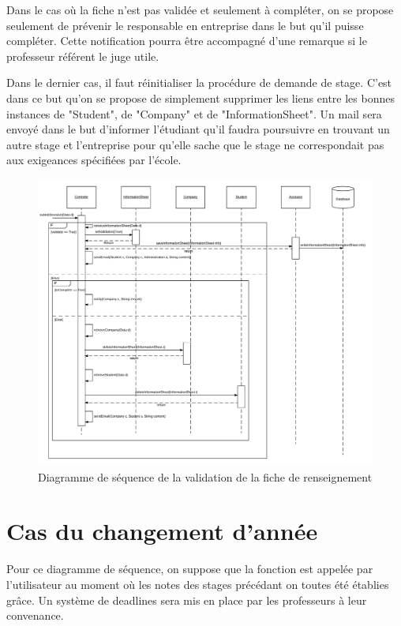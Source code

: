 \documentclass{scrreprt}
\begin{document}
	Dans le cas où la fiche n'est pas validée et seulement à compléter, on se propose seulement de prévenir le responsable en entreprise dans 
le but qu'il puisse compléter. Cette notification pourra être accompagné d'une remarque si le professeur référent le juge utile. 

	Dans le dernier cas, il faut réinitialiser la procédure de demande de stage. C'est dans ce but qu'on se propose de simplement supprimer 
les liens entre les bonnes instances de "Student", de "Company" et de "InformationSheet". Un mail sera envoyé dans le but d'informer l'étudiant
qu'il faudra poursuivre en trouvant un autre stage et l'entreprise pour qu'elle sache que le stage ne correspondait pas aux exigeances spécifiées
par l'école. 

\newpage
\begin{figure}[h]
\centering
\includegraphics[width=15cm]{images/validationSeqDiagram.png}
\caption{Diagramme de séquence de la validation de la fiche de renseignement}
\end{figure}

\newpage
\section{Cas du changement d'année}

	Pour ce diagramme de séquence, on suppose que la fonction est appelée par l'utilisateur au moment où les notes des stages
précédant on toutes été établies grâce. Un système de deadlines sera mis en place par les professeurs à leur convenance. 
\end{document}
